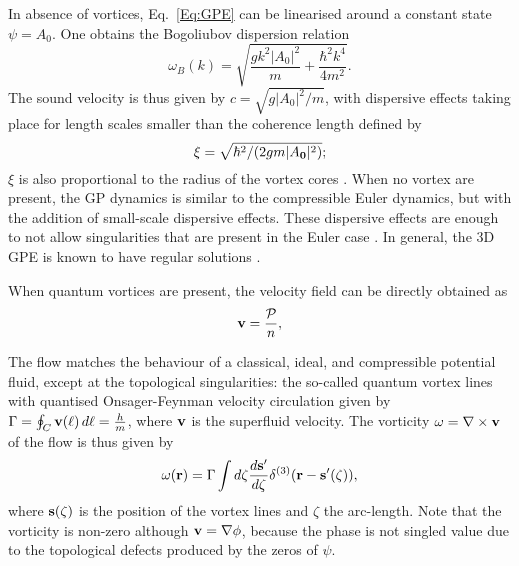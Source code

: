 \documentclass[sn-mathphys]{sn-jnl}%
\begin{document}
In absence of vortices, Eq.~\eqref{Eq:GPE} can be linearised around a constant state
$\psi=A_0$. One obtains the Bogoliubov dispersion relation
\begin{equation} 
    \omega_B(k)=\sqrt{\frac{g k^2 \lvert A_0\rvert^2}{m}+\frac{\hbar^2 k^4}{4
        m^2}}.
    \label{eq:Bog}
\end{equation} 
The sound velocity is thus given by $c=\sqrt{g\lvert A_{0}\rvert^2/m}$, with
dispersive effects taking place for length scales smaller than the 
coherence length defined by
\begin{equation}
    \xi=\sqrt{\hbar^2/(2gm\lvert A_{\bf 0}\rvert^2) } ; \label{Eq:defxi}
\end{equation}
$\xi$ is also proportional to the radius of the vortex cores
\cite{Nore97a,Nore97b}.
When no vortex are present, the GP dynamics is similar to the compressible Euler dynamics, but with the addition of small-scale dispersive effects.
These dispersive effects are enough to not allow singularities that are present in the Euler case \cite{Nore1993}. In general, the 3D GPE is known to have regular solutions \cite{Gerard2006}.


When quantum vortices are present,  the velocity field can be directly obtained as
\begin{align}
    {\bf v} = \frac{\cal P} {n},
    \label{eq:vel}
\end{align}

The flow matches the behaviour of a classical, ideal,
and compressible potential fluid, except at
the topological singularities: the so-called quantum vortex lines with quantised Onsager-Feynman velocity circulation 
given by $\Gamma = \oint_C {\bf v}(\ell) \,d\ell = \frac{h}{m}$, where ${\bf v}$ is the superfluid velocity. 
The vorticity $\bf \omega=\nabla \times {\bf v}$ of the flow is thus given by
\begin{equation}
    {\bf \omega} ({\bf r}) = \Gamma \int d \zeta \frac{d {\bf s}'}{d \zeta}
    \delta^{(3)}({\bf r} - {\bf s}'(\zeta)),
    \label{vortdelta}
\end{equation}
where ${\bf s}(\zeta)$ is the position of the vortex lines and $\zeta$ the arc-length.
Note that the vorticity is non-zero although ${\bf v}={\bf \nabla} \phi$, because the phase is not singled value due to the topological defects produced by the zeros of $\psi$.
\end{document}
